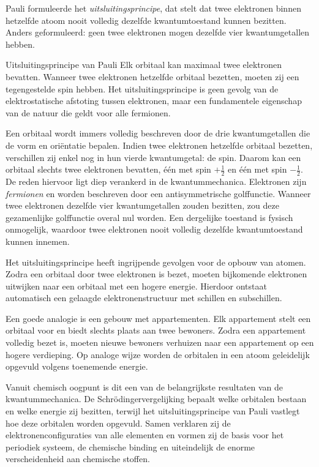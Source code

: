 Pauli formuleerde het \emph{uitsluitingsprincipe}, dat stelt dat twee elektronen binnen hetzelfde atoom nooit volledig dezelfde kwantumtoestand kunnen bezitten. Anders geformuleerd: geen twee elektronen mogen dezelfde vier kwantumgetallen hebben.

\begin{definitie}{Uitsluitingsprincipe van Pauli}
Elk orbitaal kan maximaal twee elektronen bevatten. Wanneer twee elektronen hetzelfde orbitaal bezetten, moeten zij een tegengestelde spin hebben. Het uitsluitingsprincipe is geen gevolg van de elektrostatische afstoting tussen elektronen, maar een fundamentele eigenschap van de natuur die geldt voor alle fermionen.
\end{definitie}

Een orbitaal wordt immers volledig beschreven door de drie kwantumgetallen die de vorm en oriëntatie bepalen. Indien twee elektronen hetzelfde orbitaal bezetten, verschillen zij enkel nog in hun vierde kwantumgetal: de spin. Daarom kan een orbitaal slechts twee elektronen bevatten, één met spin $+\tfrac{1}{2}$ en één met spin $-\tfrac{1}{2}$. De reden hiervoor ligt diep verankerd in de kwantummechanica. Elektronen zijn \emph{fermionen} en worden beschreven door een antisymmetrische golffunctie. Wanneer twee elektronen dezelfde vier kwantumgetallen zouden bezitten, zou deze gezamenlijke golffunctie overal nul worden. Een dergelijke toestand is fysisch onmogelijk, waardoor twee elektronen nooit volledig dezelfde kwantumtoestand kunnen innemen.

Het uitsluitingsprincipe heeft ingrijpende gevolgen voor de opbouw van atomen. Zodra een orbitaal door twee elektronen is bezet, moeten bijkomende elektronen uitwijken naar een orbitaal met een hogere energie. Hierdoor ontstaat automatisch een gelaagde elektronenstructuur met schillen en subschillen.

Een goede analogie is een gebouw met appartementen. Elk appartement stelt een orbitaal voor en biedt slechts plaats aan twee bewoners. Zodra een appartement volledig bezet is, moeten nieuwe bewoners verhuizen naar een appartement op een hogere verdieping. Op analoge wijze worden de orbitalen in een atoom geleidelijk opgevuld volgens toenemende energie.

Vanuit chemisch oogpunt is dit een van de belangrijkste resultaten van de kwantummechanica. De Schr\"odingervergelijking bepaalt welke orbitalen bestaan en welke energie zij bezitten, terwijl het uitsluitingsprincipe van Pauli vastlegt hoe deze orbitalen worden opgevuld. Samen verklaren zij de elektronenconfiguraties van alle elementen en vormen zij de basis voor het periodiek systeem, de chemische binding en uiteindelijk de enorme verscheidenheid aan chemische stoffen.

